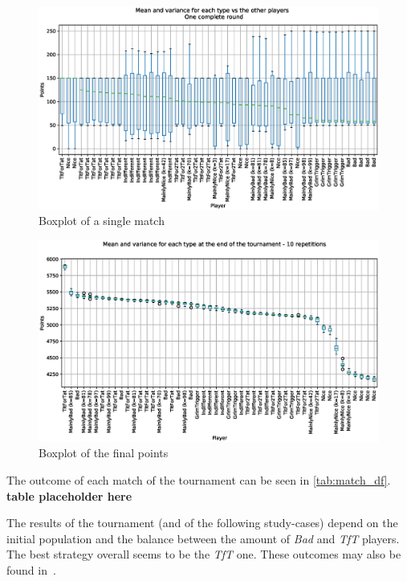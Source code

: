 \documentclass[journal,a4paper,10pt,twoside]{IEEEtran} %
\begin{document}
\begin{figure}[!ht]
    \centering
    \includegraphics[width=1\columnwidth]{../img/ipdmp/ipdmp-boxplot-single-match-50}
    \caption{Boxplot of a single match}
    \label{fig:boxIPDMPsingle}
\end{figure}

\begin{figure}[!ht]
    \centering
    \includegraphics[width=1\columnwidth]{../img/ipdmp/ipdmp-boxplot-final-points-50}
    \caption{Boxplot of the final points}
    \label{fig:boxIPDMPfinal}
\end{figure}

The outcome of each match of the tournament can be seen in \autoref{tab:match_df}. \textbf{table placeholder here}

The results of the tournament (and of the following study-cases) depend on the initial population and the balance between the amount of \textit{Bad} and \textit{TfT} players. The best strategy overall seems to be the \textit{TfT} one.
These outcomes may also be found in~\cite{mathieu2017}.
\end{document}
